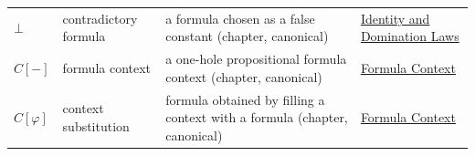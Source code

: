 \begin{longtable}{p{}p{}p{}p{}}
\(\bot\) & contradictory formula & a formula chosen as a false constant (chapter, canonical) & \hyperref[thm:identity-domination-laws-propositional-logic]{Identity and Domination Laws}\\
\(C[-]\) & formula context & a one-hole propositional formula context (chapter, canonical) & \hyperref[def:formula-context-propositional-logic]{Formula Context}\\
\(C[\varphi]\) & context substitution & formula obtained by filling a context with a formula (chapter, canonical) & \hyperref[def:formula-context-propositional-logic]{Formula Context}\\
\end{longtable}
